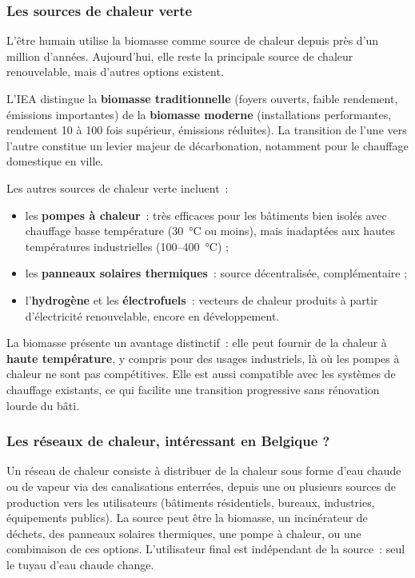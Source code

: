 \subsubsection{Les sources de chaleur verte}

L'être humain utilise la biomasse comme source de chaleur depuis près d'un million d'années. Aujourd'hui, elle reste la principale source de chaleur renouvelable, mais d'autres options existent.

L'IEA distingue la \textbf{biomasse traditionnelle} (foyers ouverts, faible rendement, émissions importantes) de la \textbf{biomasse moderne} (installations performantes, rendement 10 à 100 fois supérieur, émissions réduites). La transition de l'une vers l'autre constitue un levier majeur de décarbonation, notamment pour le chauffage domestique en ville.

Les autres sources de chaleur verte incluent~:
\begin{itemize}
    \item les \textbf{pompes à chaleur}~: très efficaces pour les bâtiments bien isolés avec chauffage basse température (30~°C ou moins), mais inadaptées aux hautes températures industrielles (100--400~°C) ;
    \item les \textbf{panneaux solaires thermiques}~: source décentralisée, complémentaire ;
    \item l'\textbf{hydrogène} et les \textbf{électrofuels}~: vecteurs de chaleur produits à partir d'électricité renouvelable, encore en développement.
\end{itemize}

La biomasse présente un avantage distinctif~: elle peut fournir de la chaleur à \textbf{haute température}, y compris pour des usages industriels, là où les pompes à chaleur ne sont pas compétitives. Elle est aussi compatible avec les systèmes de chauffage existants, ce qui facilite une transition progressive sans rénovation lourde du bâti.

\subsubsection{Les réseaux de chaleur, intéressant en Belgique ?}

Un réseau de chaleur consiste à distribuer de la chaleur sous forme d'eau chaude ou de vapeur via des canalisations enterrées, depuis une ou plusieurs sources de production vers les utilisateurs (bâtiments résidentiels, bureaux, industries, équipements publics). La source peut être la biomasse, un incinérateur de déchets, des panneaux solaires thermiques, une pompe à chaleur, ou une combinaison de ces options. L'utilisateur final est indépendant de la source~: seul le tuyau d'eau chaude change.

